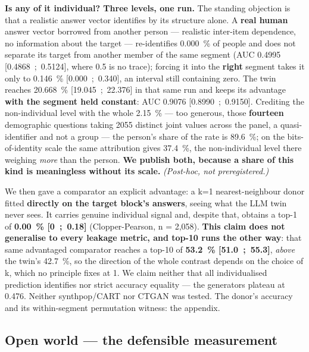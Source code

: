 \documentclass[sigconf,anonymous,review]{acmart}
\begin{document}
\textbf{Is any of it individual? Three levels, one run.} The standing objection is that a realistic answer vector identifies by its structure alone. A \textbf{real human} answer vector borrowed from another person --- realistic inter-item dependence, no information about the target --- re-identifies 0.000~\% of people and does not separate its target from another member of the same segment (AUC 0.4995 [0.4868~;~0.5124], where 0.5 is no trace); forcing it into the \textbf{right} segment takes it only to 0.146~\% [0.000~;~0.340], an interval still containing zero. The twin reaches 20.668~\% [19.045~;~22.376] in that same run and keeps its advantage \textbf{with the segment held constant}: AUC 0.9076 [0.8990~;~0.9150]. Crediting the non-individual level with the whole 2.15~\% --- too generous, those \textbf{fourteen} demographic questions taking 2055 distinct joint values across the panel, a quasi-identifier and not a group --- the person's share of the rate is 89.6~\%; on the bits-of-identity scale the same attribution gives 37.4~\%, the non-individual level there weighing \textit{more} than the person. \textbf{We publish both, because a share of this kind is meaningless without its scale.} \textit{(Post-hoc, not preregistered.)}

We then gave a comparator an explicit advantage: a k=1 nearest-neighbour donor fitted \textbf{directly on the target block's answers}, seeing what the LLM twin never sees. It carries genuine individual signal and, despite that, obtains a top-1 of \textbf{0.00~\% [0~;~0.18]} (Clopper-Pearson, n = 2,058). \textbf{This claim does not generalise to every leakage metric, and top-10 runs the other way}: that same advantaged comparator reaches a top-10 of \textbf{53.2~\% [51.0~;~55.3]}, \textit{above} the twin's 42.7~\%, so the direction of the whole contrast depends on the choice of k, which no principle fixes at 1. We claim neither that all individualised prediction identifies nor strict accuracy equality --- the generators plateau at 0.476. Neither synthpop/CART nor CTGAN was tested. The donor's accuracy and its within-segment permutation witness: the appendix.

\subsection{Open world --- the defensible measurement}
\end{document}
